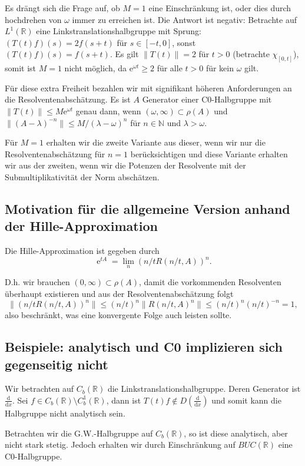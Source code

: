 \documentclass[11pt,a4paper]{scrartcl}
\newcommand{\N}{\mathbb{N}} %
\newcommand{\R}{\mathbb{R}} %
\theoremstyle{plain}
\theoremstyle{definition}
\theoremstyle{remark}
\DeclareMathOperator{\e}{e}
\begin{document}
Es drängt sich die Frage auf, ob $M=1$ eine Einschränkung ist, oder dies durch hochdrehen von $\omega$ immer zu erreichen ist. Die Antwort ist negativ: Betrachte auf $L^1(\R)$ eine Linkstranslationshalbgruppe mit Sprung: $(T(t)f)(s) = 2f(s+t)$ für $s\in [-t,0]$, sonst $(T(t)f)(s)=f(s+t)$. Es gilt $\|T(t)\|=2$ für $t>0$ (betrachte $\chi_{[0,t]}$), somit ist $M=1$ nicht möglich, da $\mathrm{e}^{\omega t} \geq 2$ für alle $t>0$ für kein $\omega$ gilt.

Für diese extra Freiheit bezahlen wir mit signifikant höheren Anforderungen an die Resolventenabschätzung. Es ist $A$ Generator einer C0-Halbgruppe mit $\|T(t)\|\leq M \mathrm{e}^{\omega t}$ genau dann, wenn $(\omega, \infty)\subset \rho(A)$ und $\|(A-\lambda)^{-n}\| \leq M/(\lambda-\omega)^n$ für $n\in \N$ und $\lambda > \omega$.

Für $M=1$ erhalten wir die zweite Variante aus dieser, wenn wir nur die Resolventenabschätzung für $n=1$ berücksichtigen und diese Variante erhalten wir aus der zweiten, wenn wir die Potenzen der Resolvente mit der Submultiplikativität der Norm abschätzen.

\subsection{Motivation für die allgemeine Version anhand der Hille-Approximation}

Die Hille-Approximation ist gegeben durch $$\e^{tA}=\lim_n (n/t R(n/t,A))^n.$$

D.h. wir brauchen $(0,\infty)\subset \rho(A)$, damit die vorkommenden Resolventen überhaupt existieren und aus der Resolventenabschätzung folgt $$\|(n/t R(n/t,A))^n\|\leq (n/t)^n \|R(n/t,A)^n\| \leq (n/t)^n (n/t)^{-n} = 1,$$ also beschränkt, was eine konvergente Folge auch leisten sollte.

\subsection{Beispiele: analytisch und C0 implizieren sich gegenseitig nicht}

Wir betrachten auf $C_b(\R)$ die Linkstranslationshalbgruppe. Deren Generator ist $\frac{\mathrm{d}}{\mathrm{d}x}$. Sei $f\in C_b(\R) \setminus C_b^1(\R)$, dann ist $T(t)f \not\in D(\frac{\mathrm{d}}{\mathrm{d}x})$ und somit kann die Halbgruppe nicht analytisch sein.

Betrachten wir die G.W.-Halbgruppe auf $C_b(\R)$, so ist diese analytisch, aber nicht stark stetig. Jedoch erhalten wir durch Einschränkung auf $BUC(\R)$ eine C0-Halbgruppe.
\end{document}
